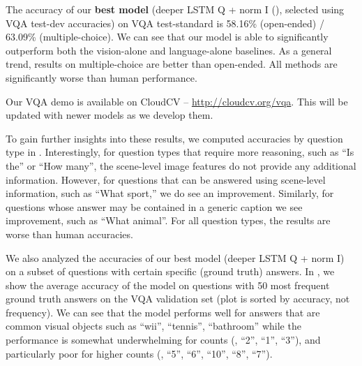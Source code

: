 The accuracy of our \textbf{best model} (deeper LSTM Q + norm I (), selected using VQA test-dev accuracies) on VQA test-standard is 58.16\% (open-ended) / 63.09\% (multiple-choice). We can see that our model is able to significantly outperform both the vision-alone and language-alone baselines. As a general trend, results on multiple-choice are better than open-ended. All methods are significantly worse than human performance.

Our VQA demo is available on CloudCV \cite{cloudcv} -- \url{http://cloudcv.org/vqa}. This will be updated with newer models as we develop them.

To gain further insights into these results, we computed accuracies by question type in . Interestingly, for question types that require more reasoning, such as ``Is the'' or ``How many'', the scene-level image features do not provide any additional information. However, for questions that can be answered using scene-level information, such as ``What sport,'' 
we do see an improvement. Similarly, for questions whose answer may be contained in a generic caption we see improvement, such as ``What animal''. For all question types, the results are worse than human accuracies.

We also analyzed the accuracies of our best model (deeper LSTM Q + norm I) on a subset of questions with certain specific (ground truth) answers. In , we show the average accuracy of the model on questions with 50 most frequent ground truth answers on the VQA validation set (plot is sorted by accuracy, not frequency). We can see that the model performs well for answers that are common visual objects such as ``wii'', ``tennis'', ``bathroom'' while the performance is somewhat underwhelming for counts (\eg, ``2'', ``1'', ``3''), and particularly poor for higher counts (\eg, ``5'', ``6'', ``10'', ``8'', ``7''). 

